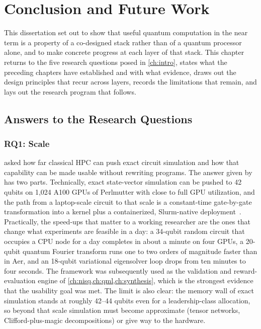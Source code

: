 \chapter{Conclusion and Future Work}\label{ch:conclusion}


This dissertation set out to show that useful quantum computation in the near term is a property of a co-designed stack rather than of a quantum processor alone, and to make concrete progress at each layer of that stack. This chapter returns to the five research questions posed in \cref{ch:intro}, states what the preceding chapters have established and with what evidence, draws out the design principles that recur across layers, records the limitations that remain, and lays out the research program that follows.

\section{Answers to the Research Questions}\label{sec:conclusion:answers}

\subsection{RQ1: Scale}\label{sec:conclusion:rq1}

 asked how far classical HPC can push exact circuit simulation and how that capability can be made usable without rewriting programs. The answer given by \qgear{} has two parts. Technically, exact state-vector simulation can be pushed to 42 qubits on 1,024 A100 GPUs of Perlmutter with close to full GPU utilization, and the path from a laptop-scale \qiskit{} circuit to that scale is a constant-time gate-by-gate transformation into a \cudaq{} kernel plus a containerized, Slurm-native deployment~\cite{guo2025qgear}. Practically, the speed-ups that matter to a working researcher are the ones that change what experiments are feasible in a day: a 34-qubit random circuit that occupies a CPU node for a day completes in about a minute on four GPUs, a 20-qubit quantum Fourier transform runs one to two orders of magnitude faster than in \qiskit{} Aer, and an 18-qubit variational eigensolver loop drops from ten minutes to four seconds. The framework was subsequently used as the validation and reward-evaluation engine of \cref{ch:nisq,ch:qml,ch:synthesis}, which is the strongest evidence that the usability goal was met. The limit is also clear: the memory wall of exact simulation stands at roughly 42--44 qubits even for a leadership-class allocation, so beyond that scale simulation must become approximate (tensor networks, Clifford-plus-magic decompositions) or give way to the hardware.

